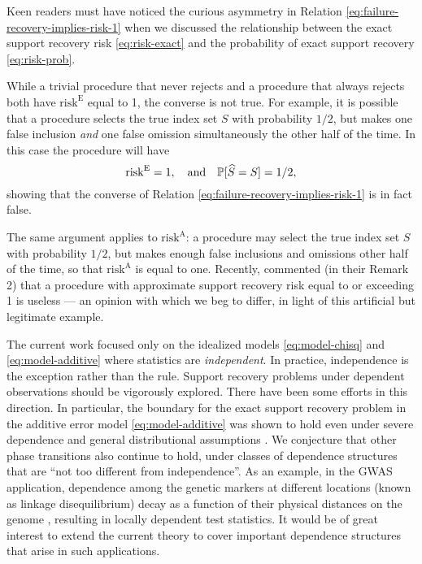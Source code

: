 \medskip

Keen readers must have noticed the curious asymmetry in Relation \eqref{eq:failure-recovery-implies-risk-1} when we discussed the relationship between the exact support recovery risk \eqref{eq:risk-exact} and the probability of exact support recovery \eqref{eq:risk-prob}.


While a trivial procedure that never rejects and a procedure that always rejects both have $\mathrm{risk}^{\mathrm{E}}$ equal to 1, the converse is not true.
For example, it is possible that a procedure selects the true index set $S$ with probability $1/2$, but makes one false inclusion \emph{and} one false omission simultaneously the other half of the time. 
In this case the procedure will have 
$$\mathrm{risk}^{\mathrm{E}} = 1, \quad \text{and} \quad \P[\widehat{S}=S] = 1/2,$$
showing that the converse of Relation \eqref{eq:failure-recovery-implies-risk-1} is in fact false.

The same argument applies to $\mathrm{risk}^{\mathrm{A}}$:
a procedure may select the true index set $S$ with probability $1/2$, but makes enough false inclusions and omissions other half of the time, so that $\mathrm{risk}^{\mathrm{A}}$ is equal to one.
Recently, \citet{arias2017distribution} commented (in their Remark 2) that a procedure with approximate support recovery risk equal to or exceeding 1 is useless --- an opinion with which we beg to differ, in light of this artificial but legitimate example.

\medskip

The current work focused only on the idealized models \eqref{eq:model-chisq} and \eqref{eq:model-additive} where statistics are \emph{independent}.
In practice, independence is the exception rather than the rule. 
Support recovery problems under dependent observations should be vigorously explored.
There have been some efforts in this direction.
In particular, the boundary for the exact support recovery problem in the additive error model \eqref{eq:model-additive} was shown to hold even under severe dependence and general distributional assumptions \cite{gao2018fundamental}.
We conjecture that other phase transitions also continue to hold, under classes of dependence structures that are ``not too different from independence''.
As an example, in the GWAS application, dependence among the genetic markers at different locations (known as linkage disequilibrium) decay as a function of their physical distances on the genome \cite{bush2012genome}, resulting in locally dependent test statistics.
It would be of great interest to extend the current theory to cover important dependence structures that arise in such applications.


